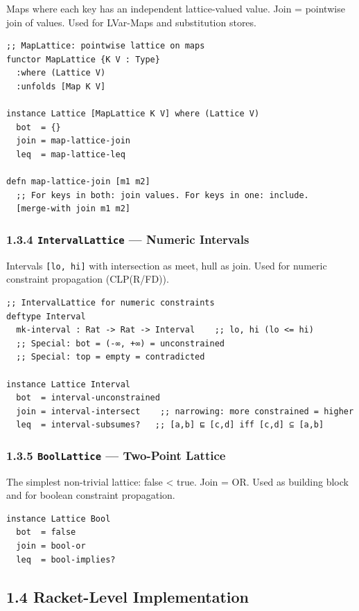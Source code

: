 \documentclass[11pt]{article}
\begin{document}
Maps where each key has an independent lattice-valued value. Join =
pointwise join of values. Used for LVar-Maps and substitution stores.

\begin{verbatim}
;; MapLattice: pointwise lattice on maps
functor MapLattice {K V : Type}
  :where (Lattice V)
  :unfolds [Map K V]

instance Lattice [MapLattice K V] where (Lattice V)
  bot  = {}
  join = map-lattice-join
  leq  = map-lattice-leq

defn map-lattice-join [m1 m2]
  ;; For keys in both: join values. For keys in one: include.
  [merge-with join m1 m2]
\end{verbatim}
\subsubsection{1.3.4 \texttt{IntervalLattice} — Numeric Intervals}
\label{sec:org99e72ca}

Intervals \texttt{[lo, hi]} with intersection as meet, hull as join. Used for
numeric constraint propagation (CLP(R/FD)).

\begin{verbatim}
;; IntervalLattice for numeric constraints
deftype Interval
  mk-interval : Rat -> Rat -> Interval    ;; lo, hi (lo <= hi)
  ;; Special: bot = (-∞, +∞) = unconstrained
  ;; Special: top = empty = contradicted

instance Lattice Interval
  bot  = interval-unconstrained
  join = interval-intersect    ;; narrowing: more constrained = higher
  leq  = interval-subsumes?   ;; [a,b] ⊑ [c,d] iff [c,d] ⊆ [a,b]
\end{verbatim}
\subsubsection{1.3.5 \texttt{BoolLattice} — Two-Point Lattice}
\label{sec:orgca78c1d}

The simplest non-trivial lattice: false < true. Join = OR.
Used as building block and for boolean constraint propagation.

\begin{verbatim}
instance Lattice Bool
  bot  = false
  join = bool-or
  leq  = bool-implies?
\end{verbatim}
\subsection{1.4 Racket-Level Implementation}
\label{sec:org7572672}
\end{document}
